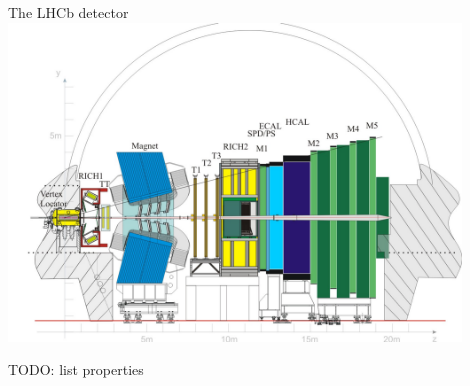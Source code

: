 \documentclass[compress,aspectratio=43]{beamer}
\begin{document}
\begin{frame}{The LHCb detector}
  \includegraphics[width=0.9\textwidth]{lhcb.pdf}

  TODO: list properties
\end{frame}
\end{document}
